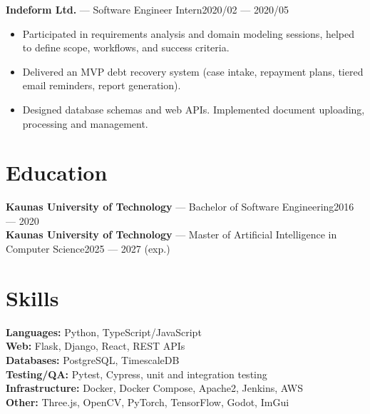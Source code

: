 \documentclass[10pt,a4paper]{article}
\newcommand{\entry}[3]{\noindent\textbf{#1} — #2\hfill #3\\}
\begin{document}
\vspace{0.4em}

\entry{Indeform Ltd.}{Software Engineer Intern}{2020/02 --- 2020/05}
\vspace{-0.8em}
\begin{itemize}[leftmargin=*,itemsep=0.0em,topsep=0.02em]
	\item Participated in requirements analysis and domain modeling sessions, helped to define scope, workflows, and success criteria.
	\item Delivered an MVP debt recovery system (case intake, repayment plans, tiered email reminders, report generation).
	\item Designed database schemas and web APIs. Implemented document uploading, processing and management.
\end{itemize}

\section*{Education}
\entry{Kaunas University of Technology}{Bachelor of Software Engineering}{2016 --- 2020}
\entry{Kaunas University of Technology}{Master of Artificial Intelligence in Computer Science}{2025 --- 2027 (exp.)}
\vspace{-0.8em}

\section*{Skills}
\textbf{Languages:} Python, TypeScript/JavaScript \\
\textbf{Web:} Flask, Django, React, REST APIs \\
\textbf{Databases:} PostgreSQL, TimescaleDB \\
\textbf{Testing/QA:} Pytest, Cypress, unit and integration testing \\
\textbf{Infrastructure:} Docker, Docker Compose, Apache2, Jenkins, AWS \\
\textbf{Other:} Three.js, OpenCV, PyTorch, TensorFlow, Godot, ImGui \\
\vspace{-0.8em}
\end{document}
